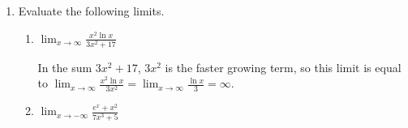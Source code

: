 \documentclass[main]{subfiles}
\begin{document}
\begin{enumerate}[resume]
\begin{enumerate}
  \item


    \begin{problem}[\vfill]
      Apply the same idea to evaluate $\displaystyle \lim_{x \to \infty}
      \frac{\ln x + \pi x^{0.1} + e^{-x}}{\sqrt[10]{7x} + \frac{1}{x}}$.
    \end{problem}

    \begin{solution}
      In the sum $\ln x + \pi x^{0.1} + e^{-x}$, $\pi x^{0.1}$ is the
      fastest growing term.  In the sum $\sqrt[10]{7x} + \frac{1}{x}$,
      $\sqrt[10]{7x}$ is the faster growing term.  Therefore, the given
      limit is equal to $\displaystyle \lim_{x \to \infty} \frac{\pi
        x^{0.1}}{\sqrt[10]{7x}}$, which we can rewrite as $\displaystyle
      \lim_{x \to \infty} \frac{\pi x^{0.1}}{\sqrt[10]{7} \sqrt[10]{x}} =
      \boxed{\frac{\pi}{\sqrt[10]{7}}}$.
    \end{solution}

  \end{enumerate}

\item  

  Evaluate the following limits.

  \begin{enumerate}

  \item


    \begin{problem}[\vfill]
      $\displaystyle \lim_{x \to \infty} \frac{x^2 \ln x}{3 x^2 + 17}$
    \end{problem}

    \begin{solution}
      In the sum $3x^2 + 17$, $3x^2$ is the faster growing term, so this
      limit is equal to $\displaystyle \lim_{x \to \infty} \frac{x^2 \ln
        x}{3 x^2} = \lim_{x \to \infty} \frac{\ln x}{3} = \boxed{\infty}$.
    \end{solution}

  \item
    \begin{problem}[\vfill]
      $\displaystyle \lim_{x \to -\infty} \frac{e^x + x^2}{7x^3 + 5}$
    \end{problem}


\end{enumerate}
\end{enumerate}
\end{document}
